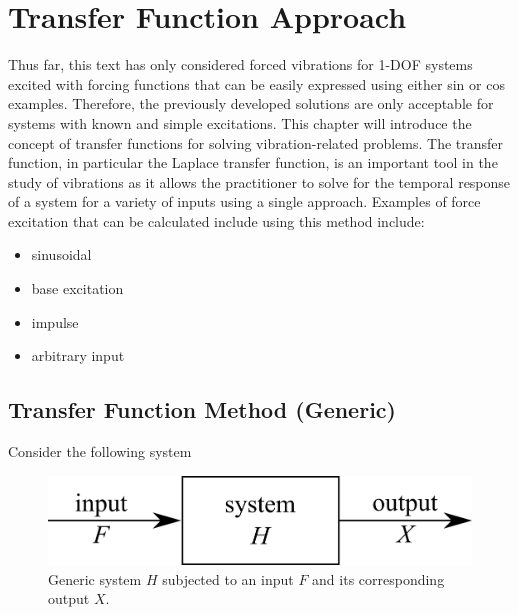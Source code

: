 \documentclass[12pt,letter]{article}
\begin{document}
	
	\setcounter{section}{3}	
	\setcounter{figure}{0}   
	\renewcommand\thefigure{\thesection.\arabic{figure}}
	\setcounter{equation}{0}   
	\renewcommand\theequation{\thesection.\arabic{equation}}

	\section{Transfer Function Approach}


		Thus far, this text has only considered forced vibrations for 1-DOF systems excited with forcing functions that can be easily expressed using either sin or cos examples. Therefore, the previously developed solutions are only acceptable for systems with known and simple excitations. This chapter will introduce the concept of transfer functions for solving vibration-related problems. The transfer function, in particular the Laplace transfer function, is an important tool in the study of vibrations as it allows the practitioner to solve for the temporal response of a system for a variety of inputs using a single approach. Examples of force excitation that can be calculated include using this method include:
		\begin{itemize}
			\item sinusoidal
			\item base excitation
			\item impulse
			\item arbitrary input
		\end{itemize}



		\subsection{Transfer Function Method (Generic)}


			Consider the following system

			\begin{figure}[H]
				\centering
				\includegraphics[]{../figures/control_system.png}
				\caption{Generic system $H$ subjected to an input $F$ and its corresponding output $X$.}
				\label{fig:control_system}
			\end{figure}
\end{document}
